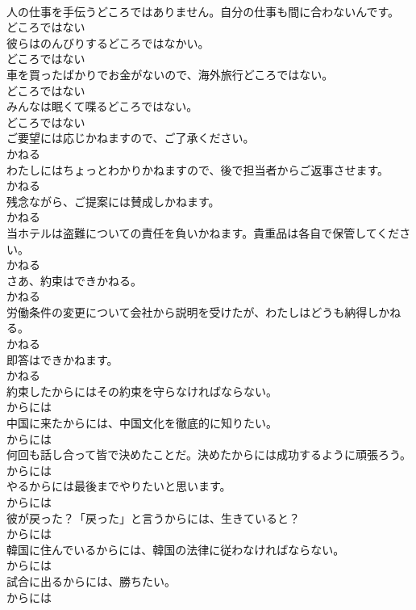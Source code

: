 \documentclass[8pt]{extreport}
\begin{document}
\begin{CJK}{UTF8}{min}
\\	人の仕事を手伝うどころではありません。自分の仕事も間に合わないんです。	
\\	どころではない
\\	彼らはのんびりするどころではなかい。	
\\	どころではない
\\	車を買ったばかりでお金がないので、海外旅行どころではない。	
\\	どころではない
\\	みんなは眠くて喋るどころではない。	
\\	どころではない
\\	ご要望には応じかねますので、ご了承ください。	
\\	かねる
\\	わたしにはちょっとわかりかねますので、後で担当者からご返事させます。	
\\	かねる
\\	残念ながら、ご提案には賛成しかねます。	
\\	かねる
\\	当ホテルは盗難についての責任を負いかねます。貴重品は各自で保管してください。	
\\	かねる
\\	さあ、約束はできかねる。	
\\	かねる
\\	労働条件の変更について会社から説明を受けたが、わたしはどうも納得しかねる。	
\\	かねる
\\	即答はできかねます。	
\\	かねる
\\	約束したからにはその約束を守らなければならない。	
\\	からには
\\	中国に来たからには、中国文化を徹底的に知りたい。	
\\	からには
\\	何回も話し合って皆で決めたことだ。決めたからには成功するように頑張ろう。	
\\	からには
\\	やるからには最後までやりたいと思います。	
\\	からには
\\	彼が戻った？「戻った」と言うからには、生きていると？	
\\	からには
\\	韓国に住んでいるからには、韓国の法律に従わなければならない。	
\\	からには
\\	試合に出るからには、勝ちたい。	
\\	からには

\end{CJK}
\end{document}

